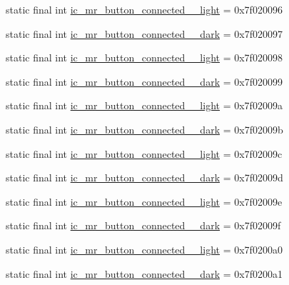 \begin{CompactItemize}
\item 
static final int \hyperlink{classandroid_1_1support_1_1v7_1_1palette_1_1_r_1_1drawable_7dec2685be1f897756527338b064c6d7}{ic\_\-mr\_\-button\_\-connected\_\_\-light} = 0x7f020096
\item 
static final int \hyperlink{classandroid_1_1support_1_1v7_1_1palette_1_1_r_1_1drawable_541906b4173f8257ed067dbe1889be11}{ic\_\-mr\_\-button\_\-connected\_\_\-dark} = 0x7f020097
\item 
static final int \hyperlink{classandroid_1_1support_1_1v7_1_1palette_1_1_r_1_1drawable_2694d8aba9f862e98b746f8af28d2c1d}{ic\_\-mr\_\-button\_\-connected\_\_\-light} = 0x7f020098
\item 
static final int \hyperlink{classandroid_1_1support_1_1v7_1_1palette_1_1_r_1_1drawable_eb787b28d72b139923691843be61f83b}{ic\_\-mr\_\-button\_\-connected\_\_\-dark} = 0x7f020099
\item 
static final int \hyperlink{classandroid_1_1support_1_1v7_1_1palette_1_1_r_1_1drawable_d405768ad31cfbca15c258e257156561}{ic\_\-mr\_\-button\_\-connected\_\_\-light} = 0x7f02009a
\item 
static final int \hyperlink{classandroid_1_1support_1_1v7_1_1palette_1_1_r_1_1drawable_a6564af64d14776f912dc3786f348e8f}{ic\_\-mr\_\-button\_\-connected\_\_\-dark} = 0x7f02009b
\item 
static final int \hyperlink{classandroid_1_1support_1_1v7_1_1palette_1_1_r_1_1drawable_2b0f8ea8dc939fa93a22c5466b5cfadd}{ic\_\-mr\_\-button\_\-connected\_\_\-light} = 0x7f02009c
\item 
static final int \hyperlink{classandroid_1_1support_1_1v7_1_1palette_1_1_r_1_1drawable_61b2250132d25405df7b940d22648015}{ic\_\-mr\_\-button\_\-connected\_\_\-dark} = 0x7f02009d
\item 
static final int \hyperlink{classandroid_1_1support_1_1v7_1_1palette_1_1_r_1_1drawable_02b0596460623f01c0a82cfb2dbe1f5e}{ic\_\-mr\_\-button\_\-connected\_\_\-light} = 0x7f02009e
\item 
static final int \hyperlink{classandroid_1_1support_1_1v7_1_1palette_1_1_r_1_1drawable_e121d774e18b2692a9afa66a2d3e138d}{ic\_\-mr\_\-button\_\-connected\_\_\-dark} = 0x7f02009f
\item 
static final int \hyperlink{classandroid_1_1support_1_1v7_1_1palette_1_1_r_1_1drawable_2de990f2dc45879eaf2846bbe852bfc1}{ic\_\-mr\_\-button\_\-connected\_\_\-light} = 0x7f0200a0
\item 
static final int \hyperlink{classandroid_1_1support_1_1v7_1_1palette_1_1_r_1_1drawable_17a7a253310daf6d33ff32f64c622111}{ic\_\-mr\_\-button\_\-connected\_\_\-dark} = 0x7f0200a1

\end{CompactItemize}
